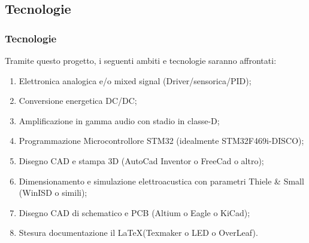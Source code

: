 \subsection{Tecnologie}
\begin{frame}[fragile]
\frametitle{Tecnologie}
Tramite questo progetto, i seguenti ambiti e tecnologie saranno affrontati:
\begin{enumerate}{}{}
\item Elettronica analogica e/o mixed signal (Driver/sensorica/PID);
\item Conversione energetica DC/DC;
\item Amplificazione in gamma audio con stadio in classe-D;
\item Programmazione Microcontrollore STM32 (idealmente STM32F469i-DISCO);
\item Disegno CAD e stampa 3D (AutoCad Inventor o FreeCad o altro);
\item Dimensionamento e simulazione elettroacustica con parametri Thiele \& Small (WinISD o simili);
\item Disegno CAD di schematico e PCB (Altium o Eagle o KiCad);
\item Stesura documentazione il \LaTeX (Texmaker o LED o OverLeaf).
\end{enumerate}
\end{frame}
